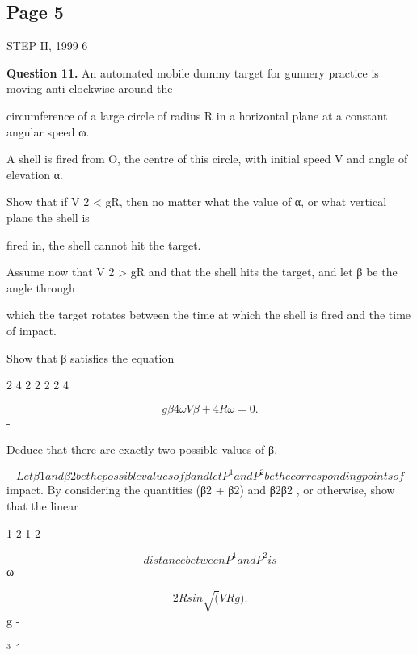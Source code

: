 \documentclass[12pt]{article}
\begin{document}
\subsection*{Page 5}
\begin{flushleft}
STEP II, 1999 6\par
\bigskip\textbf{Question 11.} An automated mobile dummy target for gunnery practice is moving anti-clockwise around the\par
circumference of a large circle of radius R in a horizontal plane at a constant angular speed ω.\par
A shell is fired from O, the centre of this circle, with initial speed V and angle of elevation α.\par
Show that if V 2 < gR, then no matter what the value of α, or what vertical plane the shell is\par
fired in, the shell cannot hit the target.\par
Assume now that V 2 > gR and that the shell hits the target, and let β be the angle through\par
which the target rotates between the time at which the shell is fired and the time of impact.\par
Show that β satisfies the equation\par
2 4 2 2 2 2 4\par
\[g β 4ω V β + 4R ω = 0.\]
-\par
Deduce that there are exactly two possible values of β.\par
\[Let β1 and β2 be the possible values of β and let P^1 and P^2 be the corresponding points of\]
impact. By considering the quantities (β2 + β2) and β2β2 , or otherwise, show that the linear\par
1 2 1 2\par
\[distance between P^1 and P^2 is\]
ω\par
\[2R sin \sqrt(V Rg) .\]
g -\par
³ ´\par
\end{flushleft}
\end{document}
